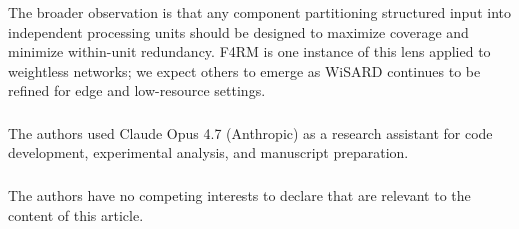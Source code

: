 \documentclass[runningheads]{llncs}
\begin{document}
The broader observation is that any component partitioning structured input into independent processing units should be designed to maximize coverage and minimize within-unit redundancy. F4RM is one instance of this lens applied to weightless networks; we expect others to emerge as WiSARD continues to be refined for edge and low-resource settings.

\begin{credits}
\subsubsection{\ackname} The authors used Claude Opus 4.7 (Anthropic) as a research assistant for code development, experimental analysis, and manuscript preparation.

\subsubsection{\discintname}
The authors have no competing interests to declare that are relevant to the content of this article.
\end{credits}

\makeatletter
\renewcommand\@biblabel[1]{#1.}
\let\oldbibliography\thebibliography
\renewcommand{\thebibliography}[1]{%
  \oldbibliography{#1}%
  \footnotesize
  \setlength{\itemsep}{0pt}%
  \setlength{\parsep}{0pt}%
}
\makeatother

\enlargethispage{6\baselineskip}
{\footnotesize}
\end{document}
